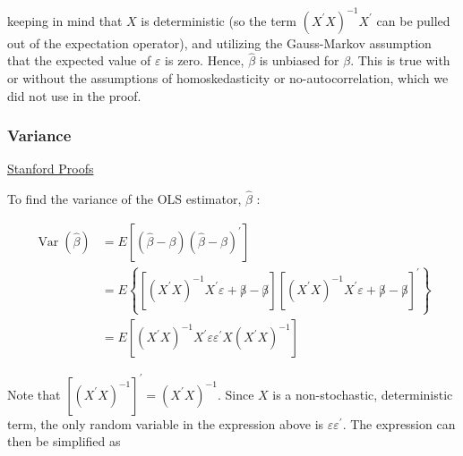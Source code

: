 keeping in mind that $X$ is deterministic (so the term $\left(X^{\prime} X\right)^{-1} X^{\prime}$ can be pulled out of the expectation operator), and utilizing the Gauss-Markov assumption that the expected value of $\varepsilon$ is zero. Hence, $\widehat{\beta}$ is unbiased for $\beta$. This is true with or without the assumptions of homoskedasticity or no-autocorrelation, which we did not use in the proof. 

\subsubsection{Variance}
\href{https://web.stanford.edu/~mrosenfe/soc_meth_proj3/matrix_OLS_NYU_notes.pdf}{Stanford Proofs}

To find the variance of the OLS estimator, $\widehat{\beta}$ :

$$
\begin{aligned}
\operatorname{Var}(\widehat{\beta}) & =E\left[(\widehat{\beta}-\beta)(\widehat{\beta}-\beta)^{\prime}\right] \\
& =E\left\{\left[\left(X^{\prime} X\right)^{-1} X^{\prime} \varepsilon+\not \beta-\not \beta\right]\left[\left(X^{\prime} X\right)^{-1} X^{\prime} \varepsilon+\not \beta-\not \beta\right]^{\prime}\right\} \\
& =E\left[\left(X^{\prime} X\right)^{-1} X^{\prime} \varepsilon \varepsilon^{\prime} X\left(X^{\prime} X\right)^{-1}\right]
\end{aligned}
$$

Note that $\left[\left(X^{\prime} X\right)^{-1}\right]^{\prime}=\left(X^{\prime} X\right)^{-1}$. Since $X$ is a non-stochastic, deterministic term, the only random variable in the expression above is $\varepsilon \varepsilon^{\prime}$. The expression can then be simplified as


